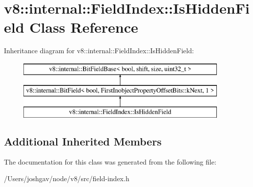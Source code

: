 \hypertarget{classv8_1_1internal_1_1_field_index_1_1_is_hidden_field}{}\section{v8\+:\+:internal\+:\+:Field\+Index\+:\+:Is\+Hidden\+Field Class Reference}
\label{classv8_1_1internal_1_1_field_index_1_1_is_hidden_field}
Inheritance diagram for v8\+:\+:internal\+:\+:Field\+Index\+:\+:Is\+Hidden\+Field\+:\begin{figure}[H]
\begin{center}
\leavevmode
\includegraphics[height=3.000000cm]{classv8_1_1internal_1_1_field_index_1_1_is_hidden_field}
\end{center}
\end{figure}
\subsection*{Additional Inherited Members}


The documentation for this class was generated from the following file\+:\begin{DoxyCompactItemize}
\item 
/\+Users/joshgav/node/v8/src/field-\/index.\+h\end{DoxyCompactItemize}
